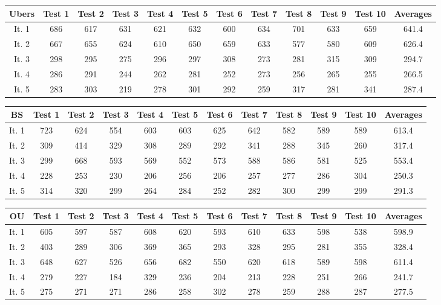 \documentclass{article}
\begin{document}
\begin{center}
	\begin{tabular}{c||c|c|c|c|c|c|c|c|c|c||c}
		Ubers&Test 1&Test 2&Test 3&Test 4&Test 5&Test 6&Test 7&Test 8&Test 9&Test 10&Averages\\
		\hline\hline
		It. 1&686&617&631&621&632&600&634&701&633&659&641.4\\
		It. 2&667&655&624&610&650&659&633&577&580&609&626.4\\
		It. 3&298&295&275&296&297&308&273&281&315&309&294.7\\
		It. 4&286&291&244&262&281&252&273&256&265&255&266.5\\
		It. 5&283&303&219&278&301&292&259&317&281&341&287.4\\
	\end{tabular}
\end{center}
\begin{center}
	\begin{tabular}{c||c|c|c|c|c|c|c|c|c|c||c}
		BS&Test 1&Test 2&Test 3&Test 4&Test 5&Test 6&Test 7&Test 8&Test 9&Test 10&Averages\\
		\hline\hline
		It. 1&723&624&554&603&603&625&642&582&589&589&613.4\\
		It. 2&309&414&329&308&289&292&341&288&345&260&317.4\\
		It. 3&299&668&593&569&552&573&588&586&581&525&553.4\\
		It. 4&228&253&230&206&256&206&257&277&286&304&250.3\\
		It. 5&314&320&299&264&284&252&282&300&299&299&291.3\\
	\end{tabular}
\end{center}
\begin{center}
	\begin{tabular}{c||c|c|c|c|c|c|c|c|c|c||c}
		OU&Test 1&Test 2&Test 3&Test 4&Test 5&Test 6&Test 7&Test 8&Test 9&Test 10&Averages\\
		\hline\hline
		It. 1&605&597&587&608&620&593&610&633&598&538&598.9\\
		It. 2&403&289&306&369&365&293&328&295&281&355&328.4\\
		It. 3&648&627&526&656&682&550&620&618&589&598&611.4\\
		It. 4&279&227&184&329&236&204&213&228&251&266&241.7\\
		It. 5&275&271&271&286&258&302&278&259&288&287&277.5\\
	\end{tabular}
\end{center}
\end{document}
